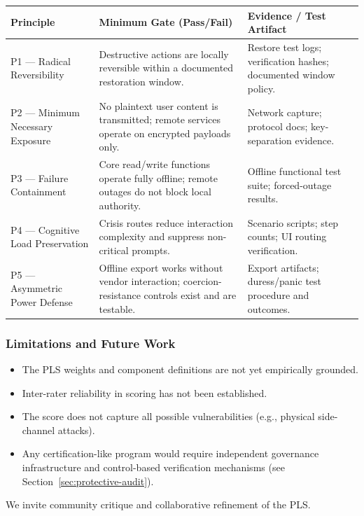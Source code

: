 \documentclass[12pt]{article}
\begin{document}
\begin{center}
\begin{tabular}{@{}p{3.2cm}p{5.4cm}p{5.0cm}@{}}
\toprule
Principle & Minimum Gate (Pass/Fail) & Evidence / Test Artifact \\
\midrule
P1 --- Radical Reversibility & Destructive actions are locally reversible within a documented restoration window. & Restore test logs; verification hashes; documented window policy. \\
\midrule
P2 --- Minimum Necessary Exposure & No plaintext user content is transmitted; remote services operate on encrypted payloads only. & Network capture; protocol docs; key-separation evidence. \\
\midrule
P3 --- Failure Containment & Core read/write functions operate fully offline; remote outages do not block local authority. & Offline functional test suite; forced-outage results. \\
\midrule
P4 --- Cognitive Load Preservation & Crisis routes reduce interaction complexity and suppress non-critical prompts. & Scenario scripts; step counts; UI routing verification. \\
\midrule
P5 --- Asymmetric Power Defense & Offline export works without vendor interaction; coercion-resistance controls exist and are testable. & Export artifacts; duress/panic test procedure and outcomes. \\
\bottomrule
\end{tabular}
\end{center}

\subsubsection{Limitations and Future Work}
\begin{itemize}
\item The PLS weights and component definitions are not yet empirically grounded.
\item Inter-rater reliability in scoring has not been established.
\item The score does not capture all possible vulnerabilities (e.g., physical side-channel attacks).
\item Any certification-like program would require independent governance infrastructure and control-based verification mechanisms (see Section~\ref{sec:protective-audit}).
\end{itemize}
We invite community critique and collaborative refinement of the PLS.
\end{document}
